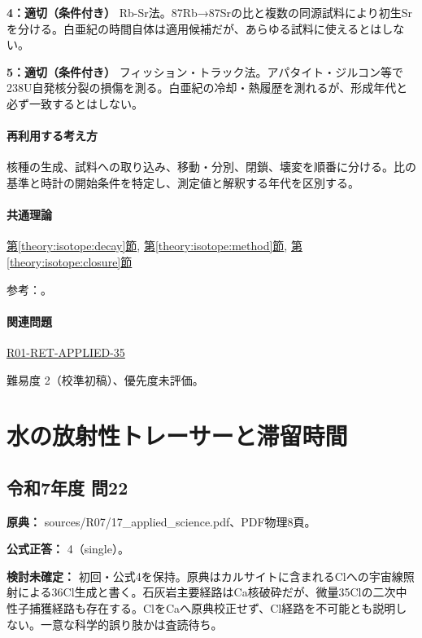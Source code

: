 \noindent\textbf{4：適切（条件付き）} Rb-Sr法。87Rb→87Srの比と複数の同源試料により初生Srを分ける。白亜紀の時間自体は適用候補だが、あらゆる試料に使えるとはしない。\par

\noindent\textbf{5：適切（条件付き）} フィッション・トラック法。アパタイト・ジルコン等で238U自発核分裂の損傷を測る。白亜紀の冷却・熱履歴を測れるが、形成年代と必ず一致するとはしない。\par

\paragraph{再利用する考え方} 核種の生成、試料への取り込み、移動・分別、閉鎖、壊変を順番に分ける。比の基準と時計の開始条件を特定し、測定値と解釈する年代を区別する。

\paragraph{共通理論} \hyperref[theory:isotope:decay]{第\ref*{theory:isotope:decay}節}, \hyperref[theory:isotope:method]{第\ref*{theory:isotope:method}節}, \hyperref[theory:isotope:closure]{第\ref*{theory:isotope:closure}節}

\par 参考：\cite{iso_radiometric,iso_zircon}。

\paragraph{関連問題} \hyperref[q:r01-ret-applied-35]{R01-RET-APPLIED-35}

\par 難易度 2（校準初稿）、優先度未評価。

\section{水の放射性トレーサーと滞留時間}

\subsection{令和7年度 問22}
\label{q:r07-reg-applied-22}

\noindent\textbf{原典：} sources/R07/17\_applied\_science.pdf、PDF物理8頁。

\textbf{公式正答：} 4（single）。

\par\textbf{検討未確定：} 初回・公式4を保持。原典はカルサイトに含まれるClへの宇宙線照射による36Cl生成と書く。石灰岩主要経路はCa核破砕だが、微量35Clの二次中性子捕獲経路も存在する。ClをCaへ原典校正せず、Cl経路を不可能とも説明しない。一意な科学的誤り肢かは査読待ち。

